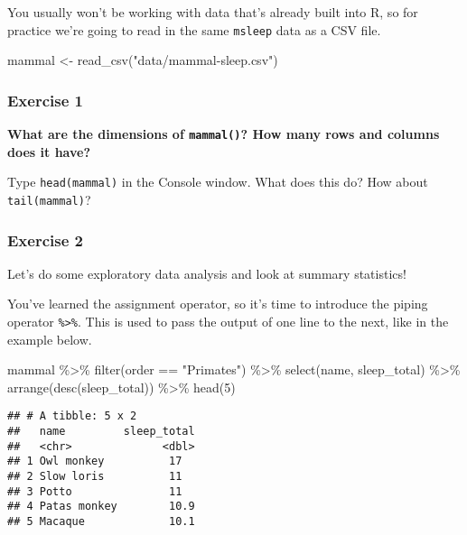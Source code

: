 \documentclass[]{article}
\newenvironment{Shaded}{\begin{snugshade}}{\end{snugshade}}
\newcommand{\DecValTok}[1]{\textcolor[rgb]{0.00,0.00,0.81}{#1}}
\newcommand{\FunctionTok}[1]{\textcolor[rgb]{0.00,0.00,0.00}{#1}}
\newcommand{\NormalTok}[1]{#1}
\newcommand{\OtherTok}[1]{\textcolor[rgb]{0.56,0.35,0.01}{#1}}
\newcommand{\SpecialCharTok}[1]{\textcolor[rgb]{0.00,0.00,0.00}{#1}}
\newcommand{\StringTok}[1]{\textcolor[rgb]{0.31,0.60,0.02}{#1}}
\begin{document}
You usually won't be working with data that's already built into R, so
for practice we're going to read in the same \texttt{msleep} data as a
CSV file.

\begin{Shaded}
\begin{Highlighting}[]
\NormalTok{mammal }\OtherTok{\textless{}{-}} \FunctionTok{read\_csv}\NormalTok{(}\StringTok{"data/mammal{-}sleep.csv"}\NormalTok{)}
\end{Highlighting}
\end{Shaded}

\hypertarget{exercise-1}{%
\subsubsection{Exercise 1}\label{exercise-1}}

\textbf{What are the dimensions of \texttt{mammal()}? How many rows and
columns does it have?}

Type \texttt{head(mammal)} in the Console window. What does this do? How
about \texttt{tail(mammal)}?

\hypertarget{exercise-2}{%
\subsubsection{Exercise 2}\label{exercise-2}}

Let's do some exploratory data analysis and look at summary statistics!

You've learned the assignment operator, so it's time to introduce the
piping operator \texttt{\%\textgreater{}\%}. This is used to pass the
output of one line to the next, like in the example below.

\begin{Shaded}
\begin{Highlighting}[]
\NormalTok{mammal }\SpecialCharTok{\%\textgreater{}\%}
  \FunctionTok{filter}\NormalTok{(order }\SpecialCharTok{==} \StringTok{"Primates"}\NormalTok{) }\SpecialCharTok{\%\textgreater{}\%}
  \FunctionTok{select}\NormalTok{(name, sleep\_total) }\SpecialCharTok{\%\textgreater{}\%}
  \FunctionTok{arrange}\NormalTok{(}\FunctionTok{desc}\NormalTok{(sleep\_total)) }\SpecialCharTok{\%\textgreater{}\%}
  \FunctionTok{head}\NormalTok{(}\DecValTok{5}\NormalTok{)}
\end{Highlighting}
\end{Shaded}

\begin{verbatim}
## # A tibble: 5 x 2
##   name         sleep_total
##   <chr>              <dbl>
## 1 Owl monkey          17  
## 2 Slow loris          11  
## 3 Potto               11  
## 4 Patas monkey        10.9
## 5 Macaque             10.1
\end{verbatim}
\end{document}
